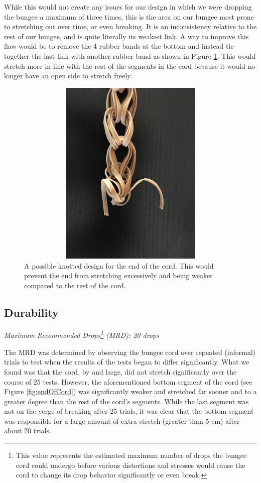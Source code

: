 \documentclass[12pt]{article}
\begin{document}
While this would not create any issues for our design in which we were dropping the bungee a maximum of three times, this is the area on our bungee most prone to stretching out over time, or even breaking. It is an inconsistency relative to the rest of our bungee, and is quite literally its weakest link.
A way to improve this flaw would be to remove the 4 rubber bands at the bottom and instead tie together the last link with another rubber band as shown in Figure \ref{fig:endOfCordSolution}. This would stretch more in line with the rest of the segments in the cord because it would no longer have an open side to stretch freely. 

\begin{figure}
    \centering
    \includegraphics[width=15cm,height=9cm,angle=180]{endOfCordSolution}
    \caption{A possible knotted design for the end of the cord. This would prevent the end from stretching excessively and being weaker compared to the rest of the cord.}
    \label{fig:endOfCordSolution}
\end{figure}
\newpage

\subsection{Durability}
\textit{Maximum Recommended Drops\footnote{This value represents the estimated maximum number of drops the bungee cord could undergo before various distortions and stresses would cause the cord to change its drop behavior significantly or even break.} (MRD): 20 drops}
\newline

The MRD was determined by observing the bungee cord over repeated (informal) trials to test when the results of the tests began to differ significantly. What we found was that the cord, by and large, did not stretch significantly over the course of 25 tests. However, the aforementioned bottom segment of the cord (see Figure \ref{fig:endOfCord}) was significantly weaker and stretched far sooner and to a greater degree than the rest of the cord's segments. While the last segment was not on the verge of breaking after 25 trials, it was clear that the bottom segment was responsible for a large amount of extra stretch (greater than 5 cm) after about 20 trials. 
\newline
\end{document}
